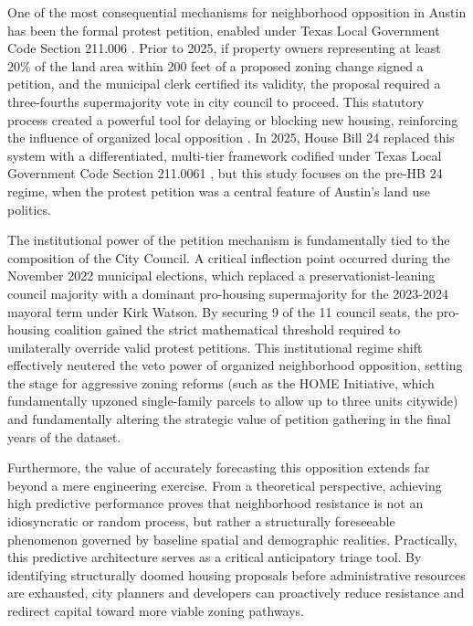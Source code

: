 \documentclass[11pt, letterpaper, oneside]{article}
\begin{document}
One of the most consequential mechanisms for neighborhood opposition in Austin has been the formal protest petition, enabled under Texas Local Government Code Section 211.006 \cite{texas211006}. Prior to 2025, if property owners representing at least 20\% of the land area within 200 feet of a proposed zoning change signed a petition, and the municipal clerk certified its validity, the proposal required a three-fourths supermajority vote in city council to proceed. This statutory process created a powerful tool for delaying or blocking new housing, reinforcing the influence of organized local opposition \cite{furth2023invisible}. In 2025, House Bill 24 replaced this system with a differentiated, multi-tier framework codified under Texas Local Government Code Section 211.0061 \cite{texas2110061,hamilton2024texas,hb24_2025}, but this study focuses on the pre-HB 24 regime, when the protest petition was a central feature of Austin's land use politics.

The institutional power of the petition mechanism is fundamentally tied to the composition of the City Council. A critical inflection point occurred during the November 2022 municipal elections, which replaced a preservationist-leaning council majority with a dominant pro-housing supermajority for the 2023-2024 mayoral term under Kirk Watson. By securing 9 of the 11 council seats, the pro-housing coalition gained the strict mathematical threshold required to unilaterally override valid protest petitions. This institutional regime shift effectively neutered the veto power of organized neighborhood opposition, setting the stage for aggressive zoning reforms (such as the HOME Initiative, which fundamentally upzoned single-family parcels to allow up to three units citywide) and fundamentally altering the strategic value of petition gathering in the final years of the dataset.

Furthermore, the value of accurately forecasting this opposition extends far beyond a mere engineering exercise. From a theoretical perspective, achieving high predictive performance proves that neighborhood resistance is not an idiosyncratic or random process, but rather a structurally foreseeable phenomenon governed by baseline spatial and demographic realities. Practically, this predictive architecture serves as a critical anticipatory triage tool. By identifying structurally doomed housing proposals before administrative resources are exhausted, city planners and developers can proactively reduce resistance and redirect capital toward more viable zoning pathways.
\end{document}
